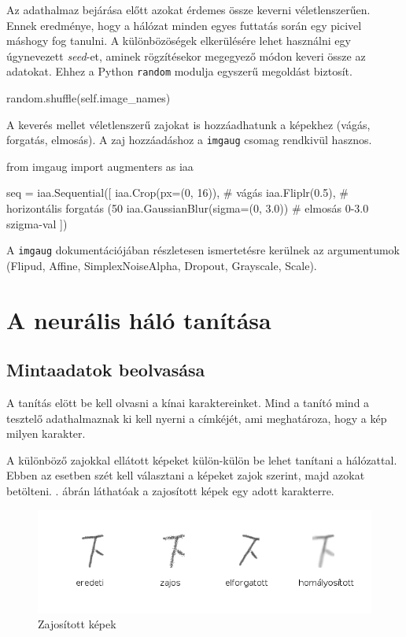 Az adathalmaz bejárása előtt azokat érdemes össze keverni véletlenszerűen. Ennek eredménye, hogy a hálózat minden egyes futtatás során egy picivel máshogy fog tanulni. A különbözöségek elkerülésére lehet használni egy úgynevezett \textit{seed}-et, aminek rögzítésekor megegyező módon keveri össze az adatokat. Ehhez a Python \texttt{random} modulja egyszerű megoldást biztosít.
\begin{python}
random.shuffle(self.image_names)
\end{python}

A keverés mellet véletlenszerű zajokat is hozzáadhatunk a képekhez (vágás, forgatás, elmosás). A zaj hozzáadáshoz a \texttt{imgaug} csomag rendkivül hasznos.

\begin{python}
from imgaug import augmenters as iaa

seq = iaa.Sequential([
    iaa.Crop(px=(0, 16)), # vágás 
    iaa.Fliplr(0.5), # horizontális forgatás (50%
    iaa.GaussianBlur(sigma=(0, 3.0)) # elmosás 0-3.0 szigma-val
])
\end{python}

A \texttt{imgaug} dokumentációjában részletesen ismertetésre kerülnek az argumentumok (Flipud, Affine, SimplexNoiseAlpha, Dropout, Grayscale, Scale).

\section{A neurális háló tanítása}

\subsection{Mintaadatok beolvasása}

A tanítás elött be kell olvasni a kínai karaktereinket. Mind a tanító mind a tesztelő adathalmaznak ki kell nyerni a címkéjét, ami meghatároza, hogy a kép milyen karakter.

A különböző zajokkal ellátott képeket külön-külön be lehet tanítani a hálózattal. Ebben az esetben szét kell választani a képeket zajok szerint, majd azokat betölteni. . ábrán láthatóak a zajosított képek egy adott karakterre.

\begin{figure}[h]
	\centering
	\includegraphics[scale=0.45]{images/pictures_with_noise}
	\caption{Zajosított képek}
	\label{fig:noisy_picture}
\end{figure}

